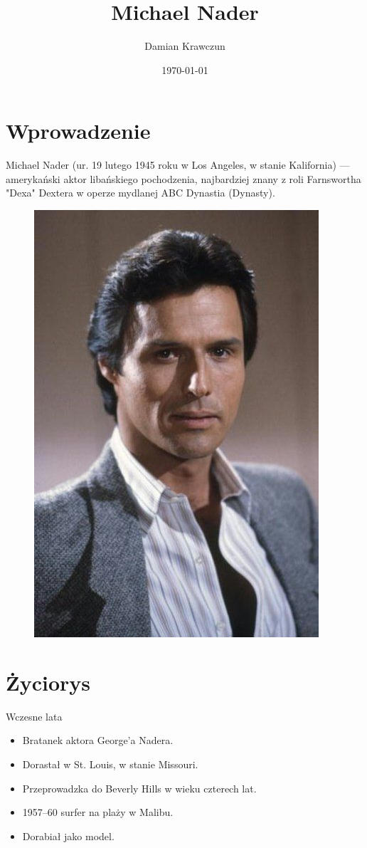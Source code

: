 \documentclass{beamer}
\title{Michael Nader}
\author{Damian Krawczun}
\institute{UWM}
\date{\today}
\begin{document}
\frame{\titlepage}
\section{Wprowadzenie}
\begin{frame}
Michael Nader (ur. 19 lutego 1945\cite{bio} roku w Los Angeles\cite{tvcom}, w stanie Kalifornia) --- amerykański aktor libańskiego pochodzenia, najbardziej znany z roli Farnswortha "Dexa" Dextera w operze mydlanej ABC Dynastia (Dynasty).
\begin{figure}[here]
\begin{center}
\includegraphics[scale=0.3]{pics/nader.jpg}
\end{center}
\end{figure}
\end{frame}

\section{Życiorys}
\begin{frame}{Wczesne lata}
\begin{itemize}
\item Bratanek aktora George'a Nadera\cite{omni}.
\item Dorastał w St. Louis, w stanie Missouri.
\pause
\item Przeprowadzka do Beverly Hills w wieku czterech lat.
\item 1957--60 surfer na plaży w Malibu.
\item Dorabiał jako model.
\end{itemize}
\end{frame}
\end{document}
